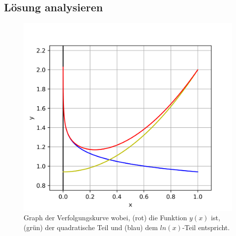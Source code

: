 \subsection{Lösung analysieren
	\label{lambertw:subsection:LoesAnalys}}
\begin{figure}
	\centering
	\includegraphics{papers/lambertw/Bilder/VerfolgungskurveBsp.png}
	\caption[Graph der Verfolgungskurve]{Graph der Verfolgungskurve wobei, ({\color{red}rot}) die Funktion \ensuremath{y(x)} ist, ({\color{darkgreen}grün}) der quadratische Teil und ({\color{blue}blau}) dem \ensuremath{ln(x)}-Teil entspricht.
	\label{lambertw:BildFunkLoes}
	}
\end{figure}

